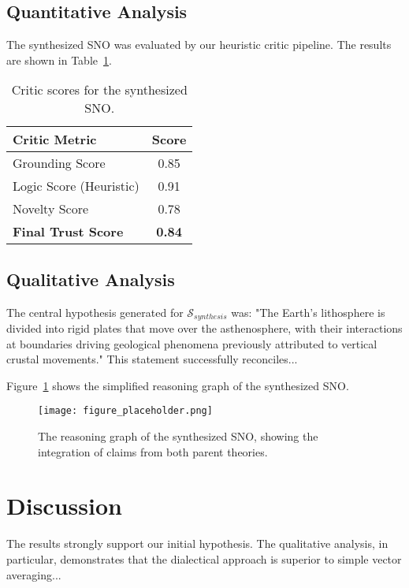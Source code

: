 \documentclass[twocolumn, 10pt]{article}
\begin{document}
\subsection{Quantitative Analysis}
The synthesized SNO was evaluated by our heuristic critic pipeline. The results are shown in Table~\ref{tab:results}.

\begin{table}[h]
    \centering
    \caption{Critic scores for the synthesized SNO.}
    \label{tab:results}
    \begin{tabular}{lc}
        \toprule
        Critic Metric & Score \\
        \midrule
        Grounding Score     & 0.85 \\
        Logic Score (Heuristic) & 0.91 \\
        Novelty Score       & 0.78 \\
        \midrule
        \textbf{Final Trust Score} & \textbf{0.84} \\
        \bottomrule
    \end{tabular}
\end{table}

\subsection{Qualitative Analysis}
The central hypothesis generated for $\mathcal{S}_{synthesis}$ was: "The Earth's lithosphere is divided into rigid plates that move over the asthenosphere, with their interactions at boundaries driving geological phenomena previously attributed to vertical crustal movements." This statement successfully reconciles...

Figure~\ref{fig:example} shows the simplified reasoning graph of the synthesized SNO.

\begin{figure}[h]
    \centering
    \texttt{[image: figure\_placeholder.png]} %
    \caption{The reasoning graph of the synthesized SNO, showing the integration of claims from both parent theories.}
    \label{fig:example}
\end{figure}

\section{Discussion}
The results strongly support our initial hypothesis. The qualitative analysis, in particular, demonstrates that the dialectical approach is superior to simple vector averaging...
\end{document}
